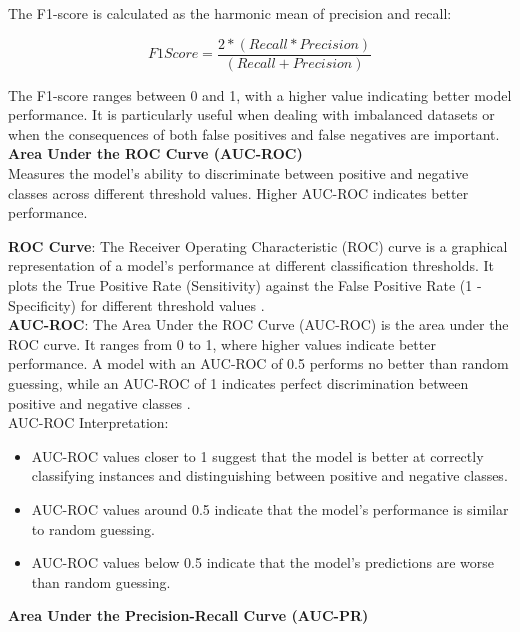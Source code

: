 The F1-score is calculated as the harmonic mean of precision and recall:

\begin{equation}\label{F1_Score_eq}F1 Score = \frac{2*(Recall * Precision)}{(Recall + Precision)}\end{equation}

The F1-score ranges between 0 and 1, with a higher value indicating better model performance. It is particularly useful when dealing with imbalanced datasets or when the consequences of both false positives and false negatives are important.\\

\textbf{Area Under the ROC Curve (AUC-ROC)}\\

Measures the model's ability to discriminate between positive and negative classes across different threshold values. Higher AUC-ROC indicates better performance.

\textbf{ROC Curve}: The Receiver Operating Characteristic (ROC) curve is a graphical representation of a model's performance at different classification thresholds. It plots the True Positive Rate (Sensitivity) against the False Positive Rate (1 - Specificity) for different threshold values \cite{Somogyi2021}.\\

\textbf{AUC-ROC}: The Area Under the ROC Curve (AUC-ROC) is the area under the ROC curve. It ranges from 0 to 1, where higher values indicate better performance. A model with an AUC-ROC of 0.5 performs no better than random guessing, while an AUC-ROC of 1 indicates perfect discrimination between positive and negative classes \cite{Somogyi2021}.\\

AUC-ROC Interpretation:

\begin{itemize}
\item AUC-ROC values closer to 1 suggest that the model is better at correctly classifying instances and distinguishing between positive and negative classes.
\item AUC-ROC values around 0.5 indicate that the model's performance is similar to random guessing.
\item AUC-ROC values below 0.5 indicate that the model's predictions are worse than random guessing.
\end{itemize}

\textbf{Area Under the Precision-Recall Curve (AUC-PR)}\\

